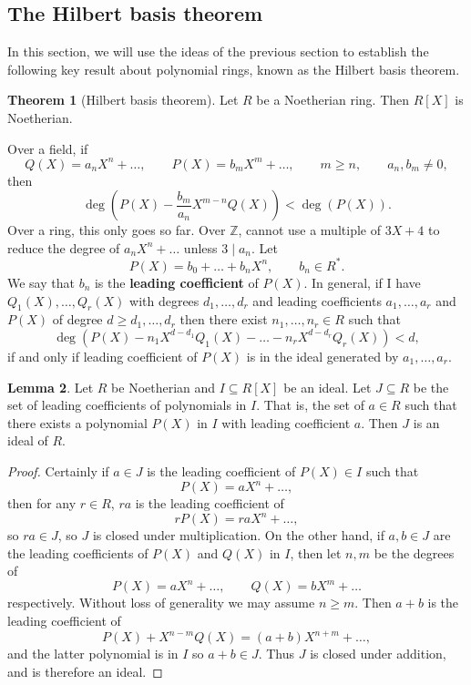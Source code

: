 \documentclass{article}
\newcommand{\Z}{\mathbb{Z}}
\newcommand{\rb}[1]{\left( #1 \right)}
\renewcommand{\sb}[1]{\left[ #1 \right]}
\theoremstyle{definition}\newtheorem{definition}{Definition}[subsection]
\theoremstyle{definition}\newtheorem{remark}[definition]{Remark}
\theoremstyle{definition}\newtheorem*{example}{Example}
\theoremstyle{definition}\newtheorem*{note}{Note}
\newtheorem{lemma}[definition]{Lemma}
\newtheorem{theorem}[definition]{Theorem}
\begin{document}
\subsection{The Hilbert basis theorem}

In this section, we will use the ideas of the previous section to establish the following key result about polynomial rings, known as the Hilbert basis theorem.

\begin{theorem}[Hilbert basis theorem]
\label{thm:9.1.1}
Let $ R $ be a Noetherian ring. Then $ R\sb{X} $ is Noetherian.
\end{theorem}


Over a field, if
$$ Q\rb{X} = a_nX^n + \dots, \qquad P\rb{X} = b_mX^m + \dots, \qquad m \ge n, \qquad a_n, b_m \ne 0, $$
then
$$ \deg\rb{P\rb{X} - \dfrac{b_m}{a_n}X^{m - n}Q\rb{X}} < \deg\rb{P\rb{X}}. $$
Over a ring, this only goes so far. Over $ \Z $, cannot use a multiple of $ 3X + 4 $ to reduce the degree of $ a_nX^n + \dots $ unless $ 3 \mid a_n $. Let
$$ P\rb{X} = b_0 + \dots + b_nX^n, \qquad b_n \in R^*. $$
We say that $ b_n $ is the \textbf{leading coefficient} of $ P\rb{X} $. In general, if I have $ Q_1\rb{X}, \dots, Q_r\rb{X} $ with degrees $ d_1, \dots, d_r $ and leading coefficients $ a_1, \dots, a_r $ and $ P\rb{X} $ of degree $ d \ge d_1, \dots, d_r $ then there exist $ n_1, \dots, n_r \in R $ such that
$$ \deg\rb{P\rb{X} - n_1X^{d - d_1}Q_1\rb{X} - \dots - n_rX^{d - d_r}Q_r\rb{X}} < d, $$
if and only if leading coefficient of $ P\rb{X} $ is in the ideal generated by $ a_1, \dots, a_r $. 

\begin{lemma}
Let $ R $ be Noetherian and $ I \subseteq R\sb{X} $ be an ideal. Let $ J \subseteq R $ be the set of leading coefficients of polynomials in $ I $. That is, the set of $ a \in R $ such that there exists a polynomial $ P\rb{X} $ in $ I $ with leading coefficient $ a $. Then $ J $ is an ideal of $ R $.
\end{lemma}

\begin{proof}
Certainly if $ a \in J $ is the leading coefficient of $ P\rb{X} \in I $ such that
$$ P\rb{X} = aX^n + \dots, $$
then for any $ r \in R $, $ ra $ is the leading coefficient of
$$ rP\rb{X} = raX^n + \dots, $$
so $ ra \in J $, so $ J $ is closed under multiplication. On the other hand, if $ a, b \in J $ are the leading coefficients of $ P\rb{X} $ and $ Q\rb{X} $ in $ I $, then let $ n, m $ be the degrees of
$$ P\rb{X} = aX^n + \dots, \qquad Q\rb{X} = bX^m + \dots $$
respectively. Without loss of generality we may assume $ n \ge m $. Then $ a + b $ is the leading coefficient of
$$ P\rb{X} + X^{n - m}Q\rb{X} = \rb{a + b}X^{n + m} + \dots, $$
and the latter polynomial is in $ I $ so $ a + b \in J $. Thus $ J $ is closed under addition, and is therefore an ideal.
\end{proof}
\end{document}
